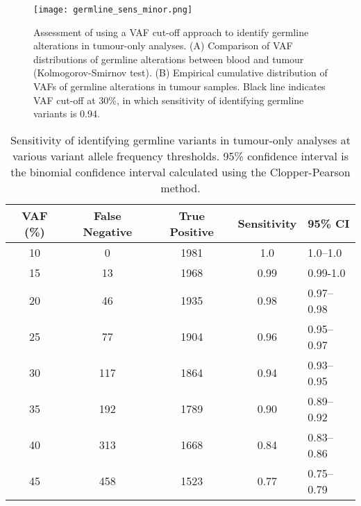 
\begin{figure}[H]
	\texttt{[image: germline\_sens\_minor.png]}
	\caption{Assessment of using a VAF cut-off approach to identify germline alterations in tumour-only analyses. (A) Comparison of VAF distributions of germline alterations between blood and tumour (Kolmogorov-Smirnov test). (B) Empirical cumulative distribution of VAFs of germline alterations in tumour samples. Black line indicates VAF cut-off at 30\%, in which sensitivity of identifying germline variants is 0.94.}
	\label{fig:germline_sens_minor}
\end{figure}


\begin{table}[H]
\caption{Sensitivity of identifying germline variants in tumour-only analyses at various variant allele frequency thresholds. 95\% confidence interval is the binomial confidence interval calculated using the Clopper-Pearson method.}
\label{tbl:sensitivity}
\centering
      \begin{tabular}{ccccl}
        \hline
        VAF (\%) & False Negative & True Positive & Sensitivity & 95\% CI
        \\
        \hline
        10 & 0 & 1981 & 1.0 & 1.0--1.0
        \\
        15 & 13 & 1968 & 0.99 & 0.99-1.0
        \\
        20 & 46 & 1935 & 0.98 & 0.97--0.98
        \\
        25 & 77 & 1904 & 0.96 & 0.95--0.97
        \\
        30 & 117 & 1864 & 0.94 & 0.93--0.95
        \\
        35 & 192 & 1789 & 0.90 & 0.89--0.92
        \\
        40 & 313 & 1668 & 0.84 & 0.83--0.86
        \\
        45 & 458 & 1523 & 0.77 & 0.75--0.79
        \\
				\hline
      \end{tabular} \\
\end{table}



